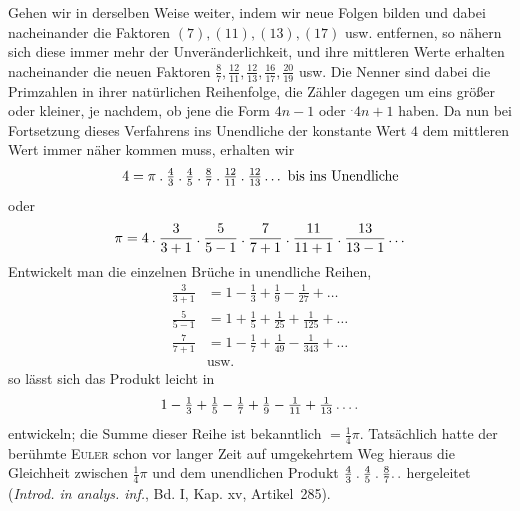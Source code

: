 Gehen wir in derselben Weise weiter, indem wir neue Folgen bilden und dabei nacheinander die Faktoren $(7),(11),(13),(17)$ usw. entfernen, so nähern sich diese immer mehr der Unveränderlichkeit, und ihre mittleren Werte erhalten nacheinander die neuen Faktoren $\tfrac87,\tfrac{12}{11},\tfrac{12}{13},\tfrac{16}{17},\tfrac{20}{19}$ usw. Die Nenner sind dabei die Primzahlen in ihrer natürlichen Reihenfolge, die Zähler dagegen um eins größer oder kleiner, je nachdem, ob jene die Form $4n-1$ oder ${}^{.}4n+1$ haben. Da nun bei Fortsetzung dieses Verfahrens ins Unendliche der konstante Wert
$4$ dem mittleren Wert immer näher kommen muss, erhalten wir
\[
4=\pi\mathbin{.}\tfrac43\mathbin{.}\tfrac45\mathbin{.}\tfrac87\mathbin{.}\tfrac{12}{11}\mathbin{.}\tfrac{12}{13}\ldots\text{ bis ins Unendliche}
\]
oder
\[
\pi=4\mathbin{.}\frac3{3+1}\mathbin{.}\frac5{5-1}\mathbin{.}\frac7{7+1}\mathbin{.}\frac{11}{11+1}\mathbin{.}\frac{13}{13-1}\ldots
\]
Entwickelt man die einzelnen Brüche in unendliche Reihen,
\begingroup{}
\[
\begin{aligned}
\frac3{3+1}&=1-\frac13+\frac19-\frac1{27}+\ldots\\
\frac5{5-1}&=1+\frac15+\frac1{25}+\frac1{125}+\ldots\\
\frac7{7+1}&=1-\frac17+\frac1{49}-\frac1{343}+\ldots\\
&\text{usw.}
\end{aligned}
\]
so lässt sich das Produkt leicht in
\endgroup
\[
1-\tfrac13+\tfrac15-\tfrac17+\tfrac19-\tfrac1{11}+\tfrac1{13}\mathinner{.\,.\,.\,.}
\]
entwickeln; die Summe dieser Reihe ist bekanntlich $=\tfrac14\pi$. Tatsächlich hatte der berühmte \textsc{Euler} schon vor langer Zeit auf umgekehrtem Weg hieraus die Gleichheit zwischen $\tfrac14\pi$ und dem unendlichen Produkt $\tfrac43\mathbin{.}\tfrac45\mathbin{.}\tfrac87\ldotp\ldotp$ hergeleitet (\emph{Introd. in analys. inf.}, Bd. I, Kap. xv, Artikel~285).

